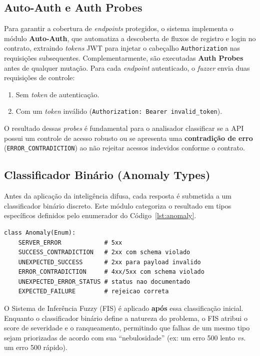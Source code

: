 \subsection{Auto-Auth e Auth Probes}

Para garantir a cobertura de \textit{endpoints} protegidos, o sistema implementa o módulo \textbf{Auto-Auth}, que automatiza a descoberta de fluxos de registro e login no contrato, extraindo \textit{tokens} JWT para injetar o cabeçalho \texttt{Authorization} nas requisições subsequentes. Complementarmente, são executadas \textbf{Auth Probes} antes de qualquer mutação. Para cada \textit{endpoint} autenticado, o \textit{fuzzer} envia duas requisições de controle:

\begin{enumerate}
    \item Sem \textit{token} de autenticação.
    \item Com um \textit{token} inválido (\texttt{Authorization: Bearer invalid\_token}).
\end{enumerate}

O resultado dessas \textit{probes} é fundamental para o analisador classificar se a API possui um controle de acesso robusto ou se apresenta uma \textbf{contradição de erro} (\texttt{ERROR\_CONTRADICTION}) ao não rejeitar acessos indevidos conforme o contrato.

\subsection{Classificador Binário (Anomaly Types)}

Antes da aplicação da inteligência difusa, cada resposta é submetida a um classificador binário discreto. Este módulo categoriza o resultado em tipos específicos definidos pelo enumerador do Código~\ref{lst:anomaly}.

\begin{lstlisting}[caption=Tipos de anomalia (\texttt{classification.py}), label=lst:anomaly]
class Anomaly(Enum):
    SERVER_ERROR            # 5xx
    SUCCESS_CONTRADICTION   # 2xx com schema violado
    UNEXPECTED_SUCCESS      # 2xx para payload invalido
    ERROR_CONTRADICTION     # 4xx/5xx com schema violado
    UNEXPECTED_ERROR_STATUS # status nao documentado
    EXPECTED_FAILURE        # rejeicao correta
\end{lstlisting}

O Sistema de Inferência Fuzzy (FIS) é aplicado \textbf{após} essa classificação inicial. Enquanto o classificador binário define a natureza do problema, o FIS atribui o score de severidade e o ranqueamento, permitindo que falhas de um mesmo tipo sejam priorizadas de acordo com sua ``nebulosidade'' (ex: um erro 500 lento \textit{vs.} um erro 500 rápido).

